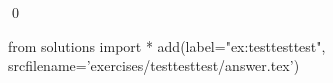 \begin{ex}
  \label{ex:testtesttest}
  
  \mbox{}\\ \\
  \qed
\end{ex}
\begin{python0}
from solutions import *
add(label="ex:testtesttest",
    srcfilename='exercises/testtesttest/answer.tex') 
\end{python0}                              
